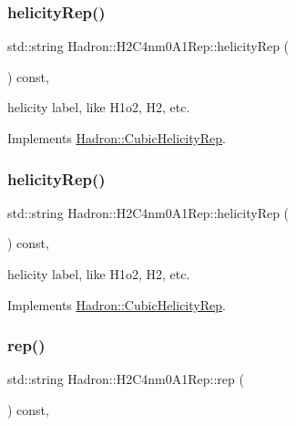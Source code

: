 \subsubsection{\texorpdfstring{helicityRep()}{helicityRep()}\hspace{0.1cm}{\footnotesize\ttfamily [2/3]}}
{\footnotesize\ttfamily std\+::string Hadron\+::\+H2\+C4nm0\+A1\+Rep\+::helicity\+Rep (\begin{DoxyParamCaption}{ }\end{DoxyParamCaption}) const\hspace{0.3cm}{\ttfamily [inline]}, {\ttfamily [virtual]}}

helicity label, like H1o2, H2, etc. 

Implements \mbox{\hyperlink{structHadron_1_1CubicHelicityRep_af1096946b7470edf0a55451cc662f231}{Hadron\+::\+Cubic\+Helicity\+Rep}}.

\mbox{\label{structHadron_1_1H2C4nm0A1Rep_a68f777d04db52d25c21b65d117a9fe71}} 
\subsubsection{\texorpdfstring{helicityRep()}{helicityRep()}\hspace{0.1cm}{\footnotesize\ttfamily [3/3]}}
{\footnotesize\ttfamily std\+::string Hadron\+::\+H2\+C4nm0\+A1\+Rep\+::helicity\+Rep (\begin{DoxyParamCaption}{ }\end{DoxyParamCaption}) const\hspace{0.3cm}{\ttfamily [inline]}, {\ttfamily [virtual]}}

helicity label, like H1o2, H2, etc. 

Implements \mbox{\hyperlink{structHadron_1_1CubicHelicityRep_af1096946b7470edf0a55451cc662f231}{Hadron\+::\+Cubic\+Helicity\+Rep}}.

\mbox{\label{structHadron_1_1H2C4nm0A1Rep_af78536d0069f367b69654854815b015d}} 
\subsubsection{\texorpdfstring{rep()}{rep()}\hspace{0.1cm}{\footnotesize\ttfamily [1/5]}}
{\footnotesize\ttfamily std\+::string Hadron\+::\+H2\+C4nm0\+A1\+Rep\+::rep (\begin{DoxyParamCaption}{ }\end{DoxyParamCaption}) const\hspace{0.3cm}{\ttfamily [inline]}, {\ttfamily [virtual]}}



